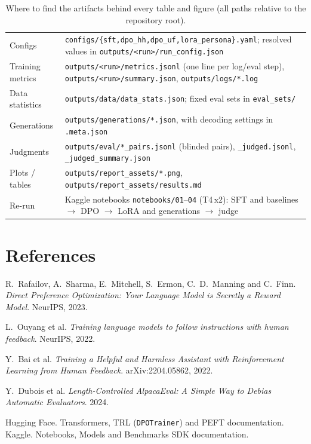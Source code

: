 \documentclass[10pt,a4paper]{article}
\newcommand{\code}[1]{\texttt{\small #1}}
\begin{document}
\begin{table}[h]
\centering\footnotesize
\caption{Where to find the artifacts behind every table and figure (all paths relative to the repository root).}
\label{tab:paths}
\begin{tabularx}{\linewidth}{@{}l >{\raggedright\arraybackslash}X@{}}
\toprule
Configs & \code{configs/\{sft,dpo\_hh,dpo\_uf,lora\_persona\}.yaml}; resolved values in \code{outputs/<run>/run\_config.json} \\
Training metrics & \code{outputs/<run>/metrics.jsonl} (one line per log/eval step), \code{outputs/<run>/summary.json}, \code{outputs/logs/*.log} \\
Data statistics & \code{outputs/data/data\_stats.json}; fixed eval sets in \code{eval\_sets/} \\
Generations & \code{outputs/generations/*.json}, with decoding settings in \code{*.meta.json} \\
Judgments & \code{outputs/eval/*\_pairs.jsonl} (blinded pairs), \code{*\_judged.jsonl}, \code{*\_judged\_summary.json} \\
Plots / tables & \code{outputs/report\_assets/*.png}, \code{outputs/report\_assets/results.md} \\
Re-run & Kaggle notebooks \code{notebooks/01}--\code{04} (T4\,x2): SFT and baselines $\rightarrow$ DPO $\rightarrow$ LoRA and generations $\rightarrow$ judge \\
\bottomrule
\end{tabularx}
\end{table}

\section*{References}
\begin{enumerate}[label={[\arabic*]},leftmargin=2.2em,itemsep=1pt]\small
\item R.~Rafailov, A.~Sharma, E.~Mitchell, S.~Ermon, C.~D.~Manning and C.~Finn. \emph{Direct Preference Optimization: Your Language Model is Secretly a Reward Model}. NeurIPS, 2023.
\item L.~Ouyang et al. \emph{Training language models to follow instructions with human feedback}. NeurIPS, 2022.
\item Y.~Bai et al. \emph{Training a Helpful and Harmless Assistant with Reinforcement Learning from Human Feedback}. arXiv:2204.05862, 2022.
\item Y.~Dubois et al. \emph{Length-Controlled AlpacaEval: A Simple Way to Debias Automatic Evaluators}. 2024.
\item Hugging Face. Transformers, TRL (\code{DPOTrainer}) and PEFT documentation. Kaggle. Notebooks, Models and Benchmarks SDK documentation.
\end{enumerate}
\end{document}
